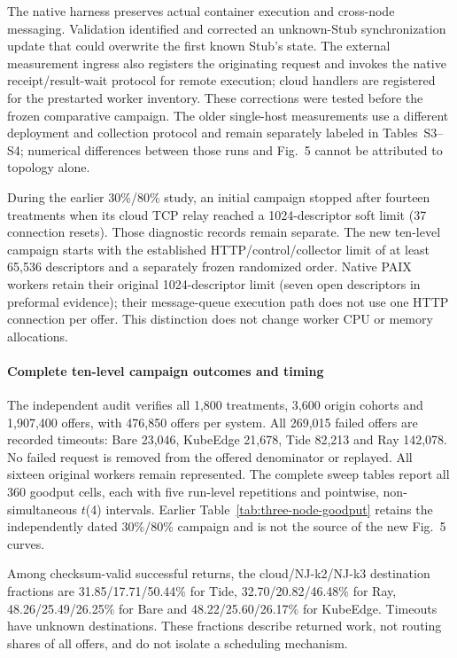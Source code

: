 The native harness preserves actual container execution and cross-node messaging. Validation identified and corrected an unknown-Stub synchronization update that could overwrite the first known Stub's state. The external measurement ingress also registers the originating request and invokes the native receipt/result-wait protocol for remote execution; cloud handlers are registered for the prestarted worker inventory. These corrections were tested before the frozen comparative campaign. The older single-host measurements use a different deployment and collection protocol and remain separately labeled in Tables~S3--S4; numerical differences between those runs and Fig.~5 cannot be attributed to topology alone.

During the earlier 30\%/80\% study, an initial campaign stopped after fourteen treatments when its cloud TCP relay reached a 1024-descriptor soft limit (37 connection resets). Those diagnostic records remain separate. The new ten-level campaign starts with the established HTTP/control/collector limit of at least 65,536 descriptors and a separately frozen randomized order. Native PAIX workers retain their original 1024-descriptor limit (seven open descriptors in preformal evidence); their message-queue execution path does not use one HTTP connection per offer. This distinction does not change worker CPU or memory allocations.

\paragraph{Complete ten-level campaign outcomes and timing}
The independent audit verifies all 1,800 treatments, 3,600 origin cohorts and 1,907,400 offers, with 476,850 offers per system. All 269,015 failed offers are recorded timeouts: Bare 23,046, KubeEdge 21,678, Tide 82,213 and Ray 142,078. No failed request is removed from the offered denominator or replayed. All sixteen original workers remain represented. The complete sweep tables report all 360 goodput cells, each with five run-level repetitions and pointwise, non-simultaneous $t$(4) intervals. Earlier Table~\ref{tab:three-node-goodput} retains the independently dated 30\%/80\% campaign and is not the source of the new Fig.~5 curves.

Among checksum-valid successful returns, the cloud/NJ-k2/NJ-k3 destination fractions are 31.85/17.71/50.44\% for Tide, 32.70/20.82/46.48\% for Ray, 48.26/25.49/26.25\% for Bare and 48.22/25.60/26.17\% for KubeEdge. Timeouts have unknown destinations. These fractions describe returned work, not routing shares of all offers, and do not isolate a scheduling mechanism.

